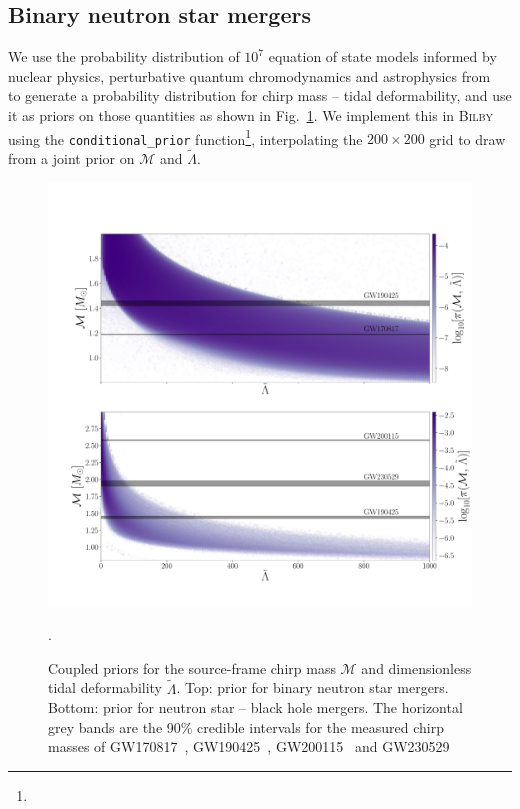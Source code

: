 \documentclass[twocolumn]{aastex631}
\begin{document}
\subsection{Binary neutron star mergers}
We use the probability distribution of $10^7$ equation of state models informed by nuclear physics, perturbative quantum chromodynamics and  astrophysics from~\citet{altiparmak22} to generate a probability distribution for chirp mass -- tidal deformability, and use it as priors on those quantities as shown in Fig.~\ref{fig:priors}. We implement this in \textsc{Bilby} using the \verb!conditional_prior! function\footnote{},
interpolating the $200\times200$ grid to draw from a joint prior on $\mathcal{M}$ and $\tilde{\Lambda}$. 
\begin{figure}
    \centering
    \includegraphics[width=1.\linewidth]{Fig_1_Physics_priors.pdf}
    \caption{Coupled priors for the source-frame chirp mass $\mathcal{M}$ and dimensionless tidal deformability $\tilde{\Lambda}$. Top: prior for binary neutron star mergers. Bottom: prior for neutron star -- black hole mergers. The horizontal grey bands are the 90\% credible intervals for the measured chirp masses of GW170817~\citep{abbott17_170817observation}, GW190425~\citep{abbott20_190425}, GW200115~\citep{GW200115} and GW230529~\citep{GW230529}}. 
    \label{fig:priors}
\end{figure}
\end{document}
